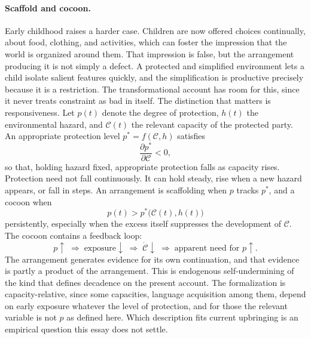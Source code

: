 \documentclass[11pt]{article}
\theoremstyle{definition}
\begin{document}
\paragraph{Scaffold and cocoon.} Early childhood raises a harder case. Children are now offered choices continually, about food, clothing, and activities, which can foster the impression that the world is organized around them. That impression is false, but the arrangement producing it is not simply a defect. A protected and simplified environment lets a child isolate salient features quickly, and the simplification is productive precisely because it is a restriction. The transformational account has room for this, since it never treats constraint as bad in itself. The distinction that matters is responsiveness. Let $p(t)$ denote the degree of protection, $h(t)$ the environmental hazard, and $\mathcal{C}(t)$ the relevant capacity of the protected party. An appropriate protection level $p^{*}=f(\mathcal{C},h)$ satisfies
\[
\frac{\partial p^{*}}{\partial \mathcal{C}}<0,
\]
so that, holding hazard fixed, appropriate protection falls as capacity rises. Protection need not fall continuously. It can hold steady, rise when a new hazard appears, or fall in steps. An arrangement is scaffolding when $p$ tracks $p^{*}$, and a cocoon when
\[
p(t) > p^{*}\big(\mathcal{C}(t),h(t)\big)
\]
persistently, especially when the excess itself suppresses the development of $\mathcal{C}$. The cocoon contains a feedback loop:
\[
p\uparrow \;\Rightarrow\; \text{exposure}\downarrow \;\Rightarrow\; \dot{\mathcal{C}}\downarrow \;\Rightarrow\; \text{apparent need for } p\uparrow.
\]
The arrangement generates evidence for its own continuation, and that evidence is partly a product of the arrangement. This is endogenous self-undermining of the kind that defines decadence on the present account. The formalization is capacity-relative, since some capacities, language acquisition among them, depend on early exposure whatever the level of protection, and for those the relevant variable is not $p$ as defined here. Which description fits current upbringing is an empirical question this essay does not settle.
\end{document}
